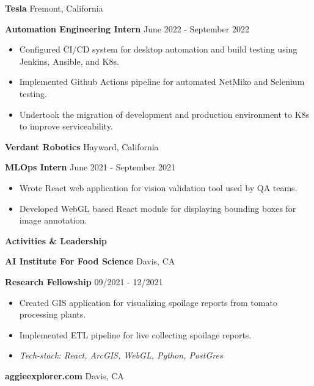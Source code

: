 \documentclass[11pt]{article}
\begin{document}
\textbf{Tesla} \hfill Fremont, California

\textbf{Automation Engineering Intern} \hfill June 2022 - September 2022
\begin{itemize}[noitemsep, topsep=0pt, partopsep=0pt, parsep=0pt]
    \item Configured CI/CD system for desktop automation and build testing using Jenkins, Ansible, and K8s.
    \item Implemented Github Actions pipeline for automated NetMiko and Selenium testing.
    \item Undertook the migration of development and production environment to K8s to improve serviceability.
\end{itemize}

\vspace{12pt}

\textbf{Verdant Robotics} \hfill Hayward, California

\textbf{MLOps Intern} \hfill June 2021 - September 2021 
\begin{itemize}[noitemsep, topsep=0pt, partopsep=0pt, parsep=0pt]
    \item Wrote React web application for vision validation tool used by QA teams.
    \item Developed WebGL based React module for displaying bounding boxes for image annotation.
\end{itemize}


\begin{center}
    \textbf{Activities \& Leadership}
\end{center}

\textbf{AI Institute For Food Science}	\hfill Davis, CA

\textbf{Research Fellowship} \hfill 09/2021 - 12/2021
\begin{itemize}[noitemsep, topsep=0pt, partopsep=0pt, parsep=0pt]
    \item Created GIS application for visualizing spoilage reports from tomato processing plants.
    \item Implemented ETL pipeline for live collecting spoilage reports.
    \item \textit{Tech-stack: React, ArcGIS, WebGL, Python, PostGres}
\end{itemize}

\vspace{12pt}

\textbf{aggieexplorer.com} \hfill Davis, CA
\end{document}
